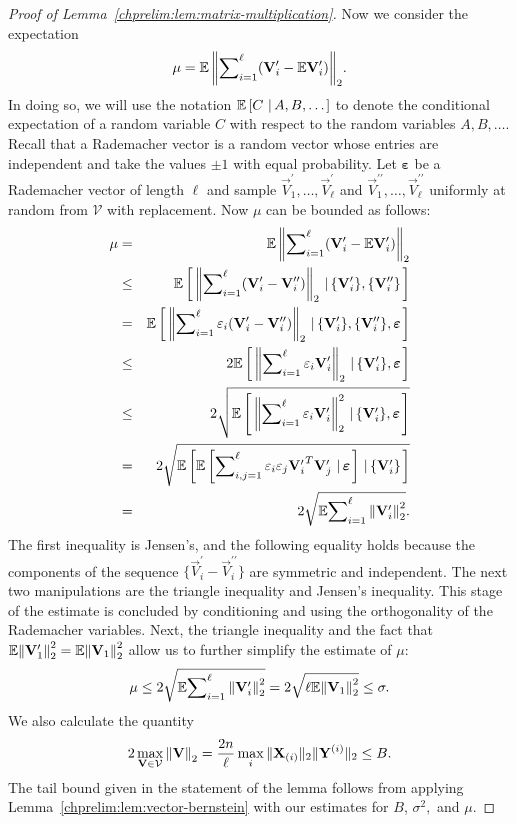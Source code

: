 \begin{proof}[Proof of Lemma~\ref{chprelim:lem:matrix-multiplication}]
Now we consider the expectation
\[
 \mu  =  \E{\TNormB{\sum\nolimits_{i=1}^\ell (\vec{V}_i^\prime - \E{\vec{V}_i^\prime})}}.
\]
In doing so, we will use the notation $\condE{A,B,\ldots}{C}$ to denote the conditional 
expectation of a random variable $C$ with respect to the random variables $A,B,\ldots.$
Recall that a Rademacher vector is a random vector whose entries are independent and 
take the values $\pm 1$ with equal probability. Let $\boldsymbol{\varepsilon}$ be a Rademacher 
vector of length $\ell$ and sample $\vec{V}_1^\prime, \ldots, \vec{V}_\ell^\prime$ and 
$\vec{V}_1^{\prime\prime}, \ldots, \vec{V}_\ell^{\prime\prime}$ uniformly at random 
from $\mathcal{V}$ with replacement. Now $\mu$ can be bounded as follows:
\begin{eqnarray*}
 \mu  & =  & \E{\TNormB{\sum\nolimits_{i=1}^\ell (\vec{V}_i^\prime - \E{\vec{V}_i^\prime})}} \\
      &\leq& \condE{\{\vec{V}_i^\prime\}, \{\vec{V}_i^{\prime\prime}\}}{\TNormB{\sum\nolimits_{i=1}^\ell (\vec{V}_i^\prime - \vec{V}_i^{\prime\prime})}} \\
      & =  & \condE{\{\vec{V}_i^\prime\}, \{\vec{V}_i^{\prime\prime}\}, \boldsymbol{\varepsilon}}{\TNormB{\sum\nolimits_{i=1}^\ell \varepsilon_i (\vec{V}_i^\prime - \vec{V}_i^{\prime\prime})}}\\
      &\leq& 2 \condE{\{\vec{V}_i^\prime\}, \boldsymbol{\varepsilon}}{\TNormB{\sum\nolimits_{i=1}^\ell \varepsilon_i \vec{V}_i^\prime}} \\
      &\leq& 2 \sqrt{ \condE{\{\vec{V}_i^\prime\}, \boldsymbol{\varepsilon}}{\TNormBS{\sum\nolimits_{i=1}^\ell \varepsilon_i \vec{V}_i^\prime}} }\\
      & = & 2 \sqrt{ \condE{\{\vec{V}_i^\prime\}}{\condE{\boldsymbol{\varepsilon}}{\sum\nolimits_{i,j=1}^\ell \varepsilon_i \varepsilon_j {\vec{V}_i^\prime}\transp \vec{V}_j^\prime} }}\\
      &=& 2 \sqrt{\E{ \sum\nolimits_{i=1}^\ell \TNormS{\vec{V}_i^\prime}} }.
\end{eqnarray*}
The first inequality is Jensen's, and the following equality holds 
because the components of the sequence $\{\vec{V}_i^\prime - \vec{V}_i^{\prime\prime}\}$ 
are symmetric and independent. The next two manipulations are the triangle 
inequality and Jensen's inequality. This stage of the estimate is concluded 
by conditioning and using the orthogonality of the Rademacher variables. Next, 
the triangle inequality and the fact that 
$\E{\TNormS{\vec{V}_1^\prime}} = \E{\TNormS{\vec{V}_1}}$ 
allow us to further simplify the estimate of $\mu:$
\[
 \mu \leq 2 \sqrt{\E{ \sum\nolimits_{i=1}^\ell \TNormS{\vec{V}_i^\prime}} } 
 = 2 \sqrt{\ell \E{\TNormS{\vec{V}_1}}} \leq \sigma.
\]
We also calculate the quantity
\[
2 \max_{\vec{V} \in \mathcal{V}} \TNorm{\vec{V}} = 
 \frac{2n}{\ell} \max_i \|\vec{X}_{(i)}\|_2\|\vec{Y}^{(i)}\|_2 \leq B.
\]
The tail bound given in the statement of the lemma follows from applying Lemma~\ref{chprelim:lem:vector-bernstein} 
with our estimates for $B$, $\sigma^2,$ and $\mu.$
\end{proof}

